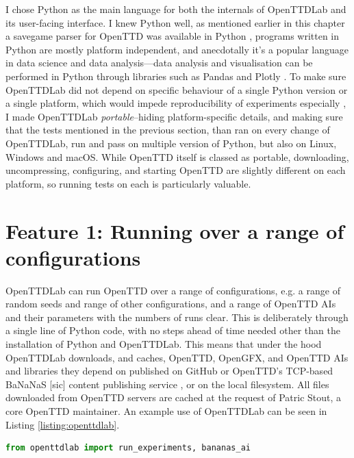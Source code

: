 \documentclass[logo,msc,dsti]{style/infthesis}    %
\begin{document}
{I chose Python as the main language for both the internals of OpenTTDLab and its user-facing interface. I knew Python well, as mentioned earlier in this chapter a savegame parser for OpenTTD was available in Python \cite{Stout2024}, programs written in Python are mostly platform independent, and anecdotally it's a popular language in data science and data analysis---data analysis and visualisation can be performed in Python through libraries such as Pandas \cite{mckinney-proc-scipy-2010,reback2020pandas,} and Plotly \cite{plotly}. To make sure OpenTTDLab did not depend on specific behaviour of a single Python version or a single platform, which would impede reproducibility of experiments especially \cite{turingway2022}, I made OpenTTDLab \emph{portable}--hiding platform-specific details, and making sure that the tests mentioned in the previous section, than ran on every change of OpenTTDLab, run and pass on multiple version of Python, but also on Linux, Windows and macOS. While OpenTTD itself is classed as portable, downloading, uncompressing, configuring, and starting OpenTTD are slightly different on each platform, so running tests on each is particularly valuable.

\section{Feature 1: Running over a range of configurations}

OpenTTDLab can run OpenTTD over a range of configurations, e.g. a range of random seeds and range of other configurations, and a range of OpenTTD AIs and their parameters with the numbers of runs clear. This is deliberately through a single line of Python code, with no steps ahead of time needed other than the installation of Python and OpenTTDLab. This means that under the hood OpenTTDLab downloads, and caches, OpenTTD, OpenGFX, and OpenTTD AIs and libraries they depend on published on GitHub or OpenTTD's TCP-based BaNaNaS [sic] content publishing service \cite{OpenTTDBaNaNaS}, or on the local filesystem. All files downloaded from OpenTTD servers are cached at the request of Patric Stout, a core OpenTTD maintainer. An example use of OpenTTDLab can be seen in Listing \ref{listing:openttdlab}.

\begin{lstlisting}[label=listing:openttdlab,language=Python, caption={Example usage of OpenTTDLab that runs the trAIns AI for a single year of in-game time for random seeds 0 to 9.}]
from openttdlab import run_experiments, bananas_ai


\end{lstlisting}}
\end{document}
